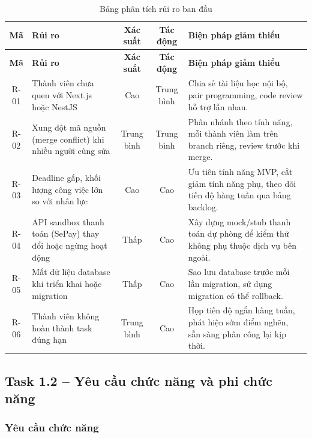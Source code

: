 \documentclass[a4paper]{article}
\begin{document}
\begingroup
\renewcommand{\arraystretch}{1.25}
\setlength{\tabcolsep}{5pt}
\setlength{\arrayrulewidth}{0.5pt}
\begin{longtable}{|c|p{3.2cm}|c|c|p{4.8cm}|}
\caption{Bảng phân tích rủi ro ban đầu}
\label{tab:rui-ro} \\
\hline
\textbf{Mã} & \textbf{Rủi ro} & \textbf{Xác suất} & \textbf{Tác động} & \textbf{Biện pháp giảm thiểu} \\ \hline
\endfirsthead
\hline
\textbf{Mã} & \textbf{Rủi ro} & \textbf{Xác suất} & \textbf{Tác động} & \textbf{Biện pháp giảm thiểu} \\ \hline
\endhead
\endfoot
\endlastfoot

R-01 & Thành viên chưa quen với Next.js hoặc NestJS & Cao & Trung bình & Chia sẻ tài liệu học nội bộ, pair programming, code review hỗ trợ lẫn nhau. \\ \hline

R-02 & Xung đột mã nguồn (merge conflict) khi nhiều người cùng sửa & Trung bình & Trung bình & Phân nhánh theo tính năng, mỗi thành viên làm trên branch riêng, review trước khi merge. \\ \hline

R-03 & Deadline gấp, khối lượng công việc lớn so với nhân lực & Cao & Cao & Ưu tiên tính năng MVP, cắt giảm tính năng phụ, theo dõi tiến độ hàng tuần qua bảng backlog. \\ \hline

R-04 & API sandbox thanh toán (SePay) thay đổi hoặc ngừng hoạt động & Thấp & Cao & Xây dựng mock/stub thanh toán dự phòng để kiểm thử không phụ thuộc dịch vụ bên ngoài. \\ \hline

R-05 & Mất dữ liệu database khi triển khai hoặc migration & Thấp & Cao & Sao lưu database trước mỗi lần migration, sử dụng migration có thể rollback. \\ \hline

R-06 & Thành viên không hoàn thành task đúng hạn & Trung bình & Cao & Họp tiến độ ngắn hàng tuần, phát hiện sớm điểm nghẽn, sẵn sàng phân công lại kịp thời. \\ \hline

\end{longtable}
\endgroup

\subsection{Task 1.2 – Yêu cầu chức năng và phi chức năng}
\subsubsection{Yêu cầu chức năng}
\end{document}
